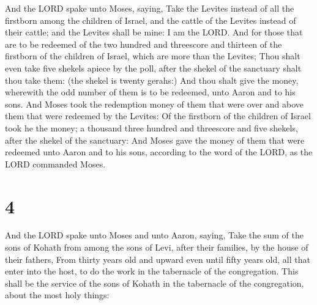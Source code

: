  And the LORD spake unto Moses, saying,  Take
the Levites instead of all the firstborn among the children of Israel,
and the cattle of the Levites instead of their cattle; and the Levites
shall be mine: I am the LORD.  And for those that are to be
redeemed of the two hundred and threescore and thirteen of the firstborn
of the children of Israel, which are more than the Levites;
 Thou shalt even take five shekels apiece by the poll,
after the shekel of the sanctuary shalt thou take them: (the shekel is
twenty gerahs:)  And thou shalt give the money, wherewith
the odd number of them is to be redeemed, unto Aaron and to his sons.
 And Moses took the redemption money of them that were over
and above them that were redeemed by the Levites:  Of the
firstborn of the children of Israel took he the money; a thousand three
hundred and threescore and five shekels, after the shekel of the
sanctuary:  And Moses gave the money of them that were
redeemed unto Aaron and to his sons, according to the word of the LORD,
as the LORD commanded Moses.

\hypertarget{section-3}{%
\section{4}\label{section-3}}

 And the LORD spake unto Moses and unto Aaron, saying,
 Take the sum of the sons of Kohath from among the sons of
Levi, after their families, by the house of their fathers, 
From thirty years old and upward even until fifty years old, all that
enter into the host, to do the work in the tabernacle of the
congregation.  This shall be the service of the sons of
Kohath in the tabernacle of the congregation, about the most holy
things:

